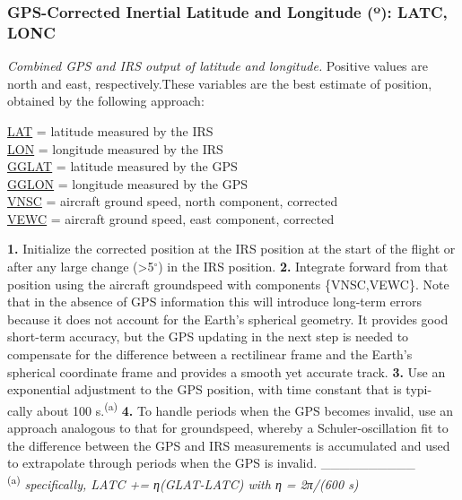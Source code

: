 \documentclass[
]{book}
\begin{document}
\hypertarget{latc-lonc}{%
\subsubsection*{\texorpdfstring{GPS-Corrected Inertial Latitude and Longitude ({º}): LATC, LONC}{GPS-Corrected Inertial Latitude and Longitude (º): LATC, LONC}}\label{latc-lonc}}

\emph{Combined GPS and IRS output of latitude and longitude.} Positive values are north and east, respectively.These variables are the best estimate of position, obtained by the following approach:

\protect\hyperlink{latitude}{LAT} = latitude measured by the IRS\\
\protect\hyperlink{longitude}{LON} = longitude measured by the IRS\\
\protect\hyperlink{gglat}{GGLAT} = latitude measured by the GPS\\
\protect\hyperlink{gglon}{GGLON} = longitude measured by the GPS\\
\protect\hyperlink{vewc-vnsc}{VNSC} = aircraft ground speed, north component, corrected\\
\protect\hyperlink{vewc-vnsc}{VEWC} = aircraft ground speed, east component, corrected

\textbf{1.} Initialize the corrected position at the IRS position at the start of the flight or after
any large change (\textgreater5\(^\circ\)) in the IRS position.
\textbf{2.} Integrate forward from that position using the aircraft groundspeed with components
\{VNSC,VEWC\}. Note that in the absence of GPS information this will introduce
long-term errors because it does not account for the Earth's spherical geometry. It
provides good short-term accuracy, but the GPS updating in the next step is needed to
compensate for the difference between a rectilinear frame and the Earth's spherical
coordinate frame and provides a smooth yet accurate track.
\textbf{3.} Use an exponential adjustment to the GPS position, with time constant that is typi-
cally about 100 s.\textsuperscript{(a)}
\textbf{4.} To handle periods when the GPS becomes invalid, use an approach analogous to that
for groundspeed, whereby a Schuler-oscillation fit to the difference between the GPS
and IRS measurements is accumulated and used to extrapolate through periods when
the GPS is invalid.
\_\_\_\_\_\_\_\_\_\_\\
\textsuperscript{(a)} \emph{specifically, LATC += η(GLAT-LATC) with η = 2π/(600 s)}
\end{document}
